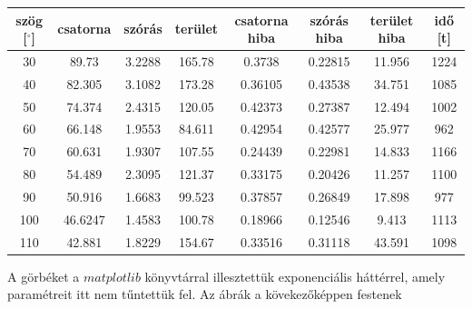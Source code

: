 \documentclass[a4paper,12pt]{article}
\begin{document}
\begin{center}
\begin{tabular}{|c|c|c|c|c|c|c|c|}
\hline
szög [$^{\circ}$] & csatorna & szórás & terület & csatorna hiba & szórás hiba & terület hiba & idő [t] \\
\hline
30 & 89.73 & 3.2288 & 165.78 & 0.3738 & 0.22815 & 11.956 & 1224 \\
\hline
40 & 82.305 & 3.1082 & 173.28 & 0.36105 & 0.43538 & 34.751 & 1085 \\
\hline
50 & 74.374 & 2.4315 & 120.05 & 0.42373 & 0.27387 & 12.494 & 1002 \\
\hline
60 & 66.148 & 1.9553 & 84.611 & 0.42954 & 0.42577 & 25.977 & 962 \\
\hline
70 & 60.631 & 1.9307 & 107.55 & 0.24439 & 0.22981 & 14.833 & 1166 \\
\hline
80 & 54.489 & 2.3095 & 121.37 & 0.33175 & 0.20426 & 11.257 & 1100 \\
\hline
90 & 50.916 & 1.6683 & 99.523 & 0.37857 & 0.26849 & 17.898 & 977 \\
\hline
100 & 46.6247 & 1.4583 & 100.78 & 0.18966 & 0.12546 & 9.413 & 1113 \\
\hline
110 & 42.881 & 1.8229 & 154.67 & 0.33516 & 0.31118 & 43.591 & 1098 \\
\hline
\end{tabular}
\end{center}

\par A görbéket a $matplotlib$ könyvtárral illesztettük exponenciális háttérrel, amely paramétreit itt nem tűntettük fel. Az ábrák a kövekezőképpen festenek
\end{document}
